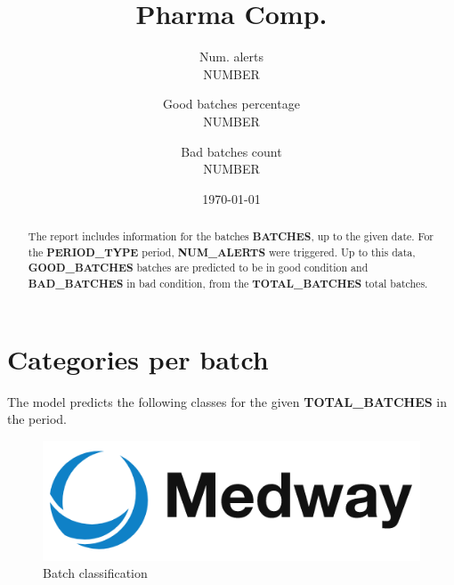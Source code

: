 \documentclass[daily]{engenius}
\title{Pharma Comp.}
\author{Num. alerts \\ NUMBER
	\and Good batches percentage \\ NUMBER
    \and Bad batches count \\ NUMBER
    }
\date{\today}
\begin{document}
\maketitle

\begin{abstract}







The report includes information for the batches \textbf{BATCHES}, up to the given date. For the \textbf{PERIOD\_TYPE} period, \textbf{NUM\_ALERTS} were triggered. Up to this data, \textbf{GOOD\_BATCHES} batches are predicted to be in good condition and \textbf{BAD\_BATCHES} in bad condition, from the \textbf{TOTAL\_BATCHES} total batches.

\end{abstract}


\section{Categories per batch}
The model predicts the following classes for the given \textbf{TOTAL\_BATCHES} in the period.

\begin{figure}[!ht]
    \begin{center}
        \includegraphics[width=\textwidth/3]{../images/logo2.png}
        \caption{Batch classification}
        \label{img:engeniuslogo}
    \end{center}
\end{figure}
\end{document}
